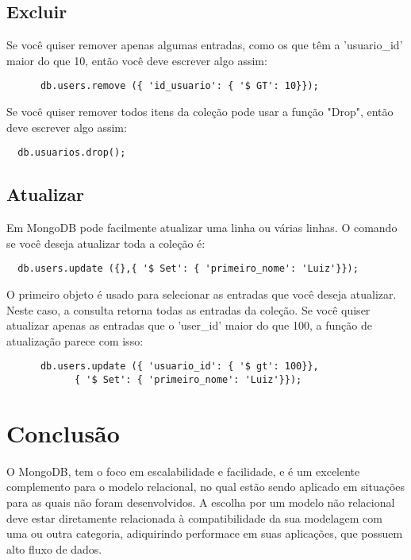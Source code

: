 \documentclass[12pt]{article}
\begin{document}
	 
\subsection{Excluir}  
Se você quiser remover apenas algumas entradas, como os que
têm a 'usuario\_id' maior do que 10, então você deve escrever algo assim: 
\begin{verbatim}
	  db.users.remove ({ 'id_usuario': { '$ GT': 10}}); 
\end{verbatim}
Se você quiser remover todos itens da coleção pode usar a função "Drop", então deve escrever algo assim:
\begin{verbatim}
  db.usuarios.drop();
\end{verbatim}


\subsection{Atualizar}  
Em MongoDB pode facilmente atualizar uma linha ou várias
linhas. O comando se você deseja atualizar toda a coleção é:
\begin{verbatim}
  db.users.update ({},{ '$ Set': { 'primeiro_nome': 'Luiz'}}); 
\end{verbatim}
O primeiro objeto é usado para selecionar as entradas que você deseja atualizar. Neste
caso, a consulta retorna todas as entradas da coleção. Se você quiser atualizar apenas as entradas que o 'user\_id' maior do que 100, a função de atualização parece com isso:
\begin{verbatim}
	  db.users.update ({ 'usuario_id': { '$ gt': 100}},
	    	{ '$ Set': { 'primeiro_nome': 'Luiz'}}); 
\end{verbatim}



\section{Conclusão}
	O MongoDB, tem o foco em escalabilidade e facilidade, e é um excelente complemento para o modelo relacional, no qual estão sendo aplicado em situações para as quais não foram desenvolvidos. A escolha por um modelo não relacional deve estar diretamente relacionada à compatibilidade da sua modelagem com uma ou outra categoria, adiquirindo performace em suas aplicações, que possuem alto fluxo de dados.
	
	
 


\end{document}

